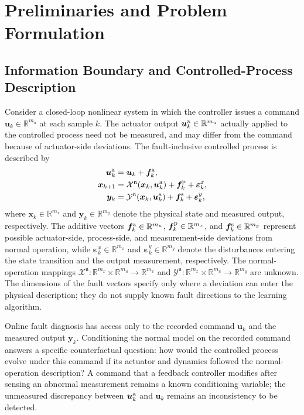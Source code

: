 \documentclass[journal]{IEEEtran}
\newcommand{\1}{\bm 1}
\begin{document}
\section{Preliminaries and Problem Formulation}
\subsection{Information Boundary and Controlled-Process Description}
Consider a closed-loop nonlinear system in which the controller issues a
command $\bm u_k\in\mathbb R^{m_u}$ at each sample $k$. The actuator output
$\bm u_k^{\rm a}\in\mathbb R^{m_u}$ actually applied to the controlled process
need not be measured, and may differ from the command because of actuator-side
deviations. The fault-inclusive controlled process is described by
\begin{equation}
\begin{aligned}
\bm u_k^{\rm a}&=\bm u_k+\bm f_k^{\rm a},\\
\bm x_{k+1}&=\mathcal X^{\mathfrak n}
(\bm x_k,\bm u_k^{\rm a})
+\bm f_k^{\rm p}+\bm\varepsilon_k^x,\\
\bm y_k&=\mathcal Y^{\mathfrak n}
(\bm x_k,\bm u_k^{\rm a})
+\bm f_k^{\rm s}+\bm\varepsilon_k^y,
\end{aligned}
\label{eq:controlled_process}
\end{equation}
where $\bm x_k\in\mathbb R^{m_x}$ and $\bm y_k\in\mathbb R^{m_y}$ denote the
physical state and measured output, respectively. The additive vectors $\bm
f_k^{\rm a}\in\mathbb R^{m_u}$, $\bm f_k^{\rm p}\in\mathbb R^{m_x}$, and $\bm
f_k^{\rm s}\in\mathbb R^{m_y}$ represent possible actuator-side, process-side,
and measurement-side deviations from normal operation, while $\bm\varepsilon_k^x
\in\mathbb R^{m_x}$ and $\bm\varepsilon_k^y\in\mathbb R^{m_y}$ denote the
disturbances entering the state transition and the output measurement,
respectively. The normal-operation
mappings $\mathcal X^{\mathfrak n}:\mathbb R^{m_x}\times\mathbb R^{m_u}
\rightarrow\mathbb R^{m_x}$ and $\mathcal Y^{\mathfrak n}:\mathbb
R^{m_x}\times\mathbb R^{m_u} \rightarrow\mathbb R^{m_y}$ are unknown. The
dimensions of the fault vectors specify only where a deviation can enter the
physical description; they do not supply known fault directions to the
learning algorithm.

Online fault diagnosis has access only to the recorded command $\bm u_k$ and
the measured output $\bm y_k$. Conditioning the normal model on the recorded
command answers a specific counterfactual question: how would the controlled
process evolve under this command if its actuator and dynamics followed the
normal-operation description? A command that a feedback controller modifies
after sensing an abnormal measurement remains a known conditioning variable;
the unmeasured discrepancy between $\bm u_k^{\rm a}$ and $\bm u_k$ remains an
inconsistency to be detected.
\end{document}
